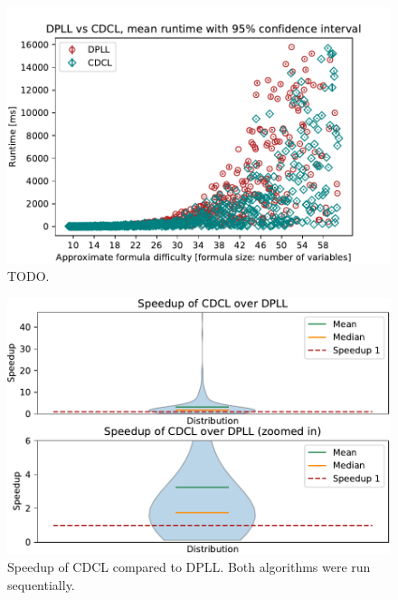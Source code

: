 \documentclass[letterpaper]{article}
\begin{document}
\begin{figure}
  \centering
  \includegraphics[width=\columnwidth]{figures/dpll_vs_cdcl_scatter}
  \caption{TODO.\label{dpll_vs_cdcl_speedup}}
\end{figure}

\begin{figure}
  \centering
  \includegraphics[width=\columnwidth]{figures/dpll_vs_cdcl_speedup}
  \caption{Speedup of CDCL compared to DPLL. Both algorithms were run sequentially.\label{dpll_vs_cdcl_speedup}}
\end{figure}
\end{document}
